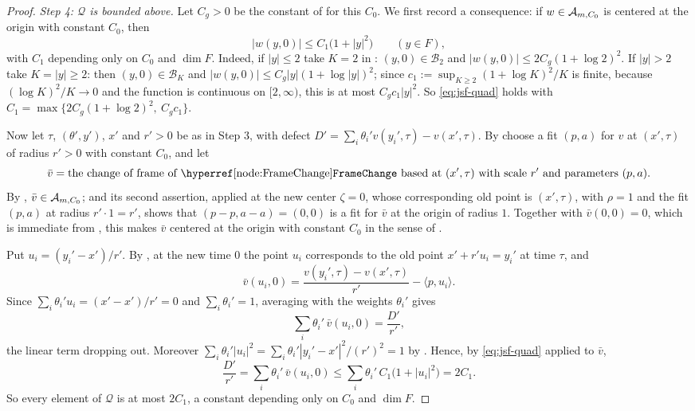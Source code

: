 \begin{proof}
\emph{Step 4: $\mathcal Q$ is bounded above.}
Let $C_g>0$ be the constant of  for this $C_0$. We
first record a consequence: if $w\in\mathcal{A}_{m,C_0}$ is centered at the origin
with constant $C_0$, then
\begin{equation}\label{eq:jsf-quad}
  |w(y,0)|\le C_1\bigl(1+|y|^2\bigr)\qquad(y\in F),
\end{equation}
with $C_1$ depending only on $C_0$ and $\dim F$. Indeed, if $|y|\le2$ take
$K=2$ in : $(y,0)\in\mathcal B_2$ and
$|w(y,0)|\le2C_g(1+\log2)^2$. If $|y|>2$ take $K=|y|\ge2$: then
$(y,0)\in\mathcal B_K$ and $|w(y,0)|\le C_g|y|(1+\log|y|)^2$; since
$c_1:=\sup_{K\ge2}(1+\log K)^2/K$ is finite, because $(\log K)^2/K\to0$ and the
function is continuous on $[2,\infty)$, this is at most $C_gc_1|y|^2$. So
\eqref{eq:jsf-quad} holds with $C_1=\max\{2C_g(1+\log2)^2,\ C_gc_1\}$.

Now let $\tau$, $(\theta',y')$, $x'$ and $r'>0$ be as in Step 3, with defect
$D'=\sum_i\theta_i'v(y_i',\tau)-v(x',\tau)$. By  choose a fit
$(p,a)$ for $v$ at $(x',\tau)$ of radius $r'>0$ with constant $C_0$, and let
\[
  \bar v=\text{the change of frame of \noderef{FrameChange} based at }
  (x',\tau)\text{ with scale }r'\text{ and parameters }(p,a).
\]
By , $\bar v\in\mathcal{A}_{m,C_0}$; and its second
assertion, applied at the new center $\zeta=0$, whose corresponding old point is
$(x',\tau)$, with $\rho=1$ and the fit $(p,a)$ at radius $r'\cdot1=r'$, shows
that $(p-p,a-a)=(0,0)$ is a fit for $\bar v$ at the origin of radius $1$.
Together with $\bar v(0,0)=0$, which is immediate from ,
this makes $\bar v$ centered at the origin with constant $C_0$ in the sense of
.

Put $u_i=(y_i'-x')/r'$. By , at the new time $0$ the point
$u_i$ corresponds to the old point $x'+r'u_i=y_i'$ at time $\tau$, and
\[
  \bar v(u_i,0)=\frac{v(y_i',\tau)-v(x',\tau)}{r'}-\langle p,u_i\rangle .
\]
Since $\sum_i\theta_i'u_i=(x'-x')/r'=0$ and $\sum_i\theta_i'=1$, averaging with
the weights $\theta_i'$ gives
\begin{equation}\label{eq:jsf-transfer}
  \sum_i\theta_i'\,\bar v(u_i,0)=\frac{D'}{r'} ,
\end{equation}
the linear term dropping out. Moreover
$\sum_i\theta_i'|u_i|^2=\sum_i\theta_i'|y_i'-x'|^2/(r')^2=1$ by
. Hence, by \eqref{eq:jsf-quad} applied to $\bar v$,
\[
  \frac{D'}{r'}=\sum_i\theta_i'\,\bar v(u_i,0)
   \le\sum_i\theta_i'\,C_1\bigl(1+|u_i|^2\bigr)=2C_1 .
\]
So every element of $\mathcal Q$ is at most $2C_1$, a constant depending only on
$C_0$ and $\dim F$.


\end{proof}
